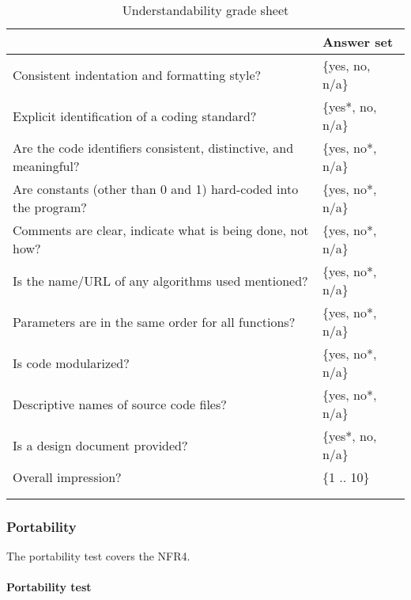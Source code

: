 \documentclass[12pt, titlepage]{article}
\begin{document}
\begin{longtable}{l l}
	\begin{tabular}{l l} 
	\toprule		
	\textbf{Questions} & \textbf{Answer set}\\
	\midrule 
	Consistent indentation and formatting style? & \{yes, no, n/a\}\\
	Explicit identification of a coding standard? & \{yes*, no, n/a\}\\
	Are the code identifiers consistent, distinctive, and meaningful? & \{yes, 
	no*, n/a\} \\
	Are constants (other than 0 and 1) hard-coded into the program? & \{yes, 
	no*, n/a\} \\
	Comments are clear, indicate what is being done, not how? & \{yes, no*, 
	n/a\} \\
	Is the name/URL of any algorithms used mentioned? & \{yes, no*, n/a\} \\
	Parameters are in the same order for all functions? & \{yes, no*, n/a\} \\
	Is code modularized? & \{yes, no*, n/a\} \\
	Descriptive names of source code files? & \{yes, no*, n/a\} \\
	Is a design document provided? & \{yes*, no, n/a\} \\
	Overall impression? & \{1 .. 10\} \\
	\bottomrule
	\caption{Understandability grade sheet} \label{Undgradesheet} \\
\end{tabular}\\
\end{longtable}

\subsubsection{Portability} \label{port}
The portability test covers the NFR4.
\paragraph{Portability test}
\end{document}
